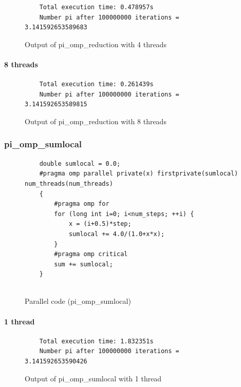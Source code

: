 \documentclass[12pt, a4paper]{article}
\begin{document}
\begin{figure}[H]
	\begin{lstlisting}
	Total execution time: 0.478957s
	Number pi after 100000000 iterations = 3.141592653589683			
	\end{lstlisting}
	\caption{Output of pi\_omp\_reduction with 4 threads}
\end{figure}

\paragraph{8 threads}

\begin{figure}[H]
	\begin{lstlisting}
	Total execution time: 0.261439s
	Number pi after 100000000 iterations = 3.141592653589815
	\end{lstlisting}
	\caption{Output of pi\_omp\_reduction with 8 threads}
\end{figure}

\subsubsection{pi\_omp\_sumlocal}

\begin{figure}[H]
	\begin{lstlisting}
	double sumlocal = 0.0;
	#pragma omp parallel private(x) firstprivate(sumlocal) num_threads(num_threads)
    {
        #pragma omp for 
        for (long int i=0; i<num_steps; ++i) {
            x = (i+0.5)*step;
            sumlocal += 4.0/(1.0+x*x);
        }
        #pragma omp critical 
		sum += sumlocal;
    }


	\end{lstlisting}
	
	\caption{Parallel code (pi\_omp\_sumlocal)}
\end{figure}

\paragraph{1 thread}

\begin{figure}[H]
	\begin{lstlisting}
	Total execution time: 1.832351s
	Number pi after 100000000 iterations = 3.141592653590426		
	\end{lstlisting}
	\caption{Output of pi\_omp\_sumlocal with 1 thread}
\end{figure}
\end{document}

